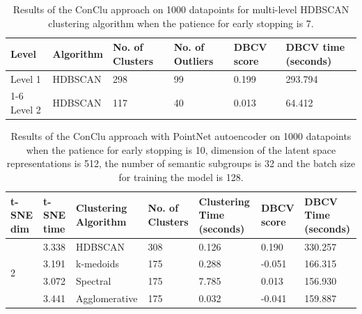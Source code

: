 \begin{table}[H]
  \setlength\extrarowheight{10pt}
  \caption{Results of the ConClu approach on 1000 datapoints for multi-level \ac{HDBSCAN} clustering algorithm when the patience for early stopping is 7. }
  \centering
  \begin{tabular}{|l|l|l|l|l|l|}
    \toprule
    Level & Algorithm	& No. of Clusters	& No. of Outliers	& DBCV score	& \ac{DBCV} time (seconds)	\\  
    \midrule
    Level 1 & \ac{HDBSCAN} & 298	& 99	& 0.199	& 293.794 \\ \cline{1-6}
    Level 2 & \ac{HDBSCAN} & 117	& 40	& 0.013	& 64.412
    \\ 
    \bottomrule
  \end{tabular}
  \label{tab:conclu_patience_7_levels}
\end{table}

\begin{table}[H]
  \setlength\extrarowheight{10pt}
  \caption{Results of the ConClu approach with PointNet autoencoder on 1000 datapoints when the patience for early stopping is 10, dimension of the latent space representations is 512, the number of semantic subgroups is 32 and the batch size for training the model is 128. }
  \centering
  \begin{tabular}{|p{30pt}|p{50pt}|p{60pt}|p{50pt}|p{50pt}|p{50pt}|p{40pt}|}
    \toprule
    \ac{t-SNE} dim	& \ac{t-SNE} time & Clustering Algorithm & No. of Clusters & Clustering Time (seconds) & \ac{DBCV} score & \ac{DBCV} Time (seconds)\\
    \midrule
    \multirow{4}{30pt}{2}	& 3.338	& \ac{HDBSCAN}	& 308	& 0.126	& 0.190	& 330.257 \\ \cline{2-7} 
    & 3.191	& k-medoids	& 175	& 0.288	& -0.051	& 166.315 \\ \cline{2-7} 
    & 3.072	& Spectral	& 175	& 7.785	& 0.013	& 156.930 \\ \cline{2-7}
    & 3.441	& Agglomerative	& 175	& 0.032	& -0.041	& 159.887 \\ 
    \bottomrule
  \end{tabular}
  \label{tab:conclu_patience_10}
\end{table}

